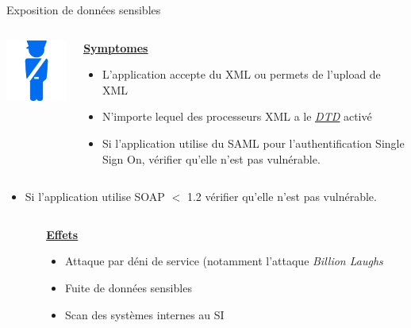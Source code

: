 \documentclass[final,hyperref={pdfpagelabels=false}]{beamer}
\begin{document}
\begin{frame}[t]
\begin{columns}[t]
\begin{column}{.465\textwidth}
\begin{block}{Exposition de données sensibles}
	\begin{columns}[T]

		\begin{column}{.12\textwidth} %
			\includegraphics[scale=1.35]{access.png}
		\end{column}

		\begin{column}{.88\textwidth}
			\uline{\uline{\textbf{Symptomes}}}
			\begin{itemize}
				\item L'application accepte du XML ou permets de l'upload de XML
                \item N'importe lequel des processeurs XML a le
                    \href{https://www.w3schools.com/xml/xml_dtd_intro.asp}{\uline{\textit{DTD}}}
                    activé
				\item Si l'application utilise du SAML pour l'authentification
                    Single Sign On, vérifier qu'elle n'est pas vulnérable.
			\end{itemize}
		\end{column}
	\end{columns}
    \begin{itemize}
        \item Si l'application utilise SOAP $<$ 1.2 vérifier qu'elle n'est
            pas vulnérable.
    \end{itemize}
	\begin{columns}[T]
		\begin{column}{.01\textwidth}
		\end{column}
		\begin{column}{0.495\textwidth}
			\vfill
			\uline{\textbf{Effets}}
			\begin{itemize}
                \item Attaque par déni de service (notamment l'attaque \textit{Billion
                    Laughs}
				\item Fuite de données sensibles
                \item Scan des systèmes internes au SI

\end{itemize}
\end{column}
\end{columns}
\end{block}
\end{column}
\end{columns}
\end{frame}
\end{document}
